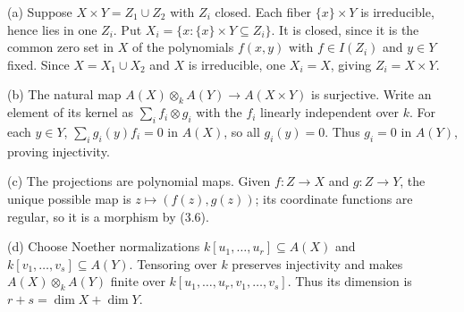 (a) Suppose $X\times Y=Z_1\cup Z_2$ with $Z_i$ closed. Each fiber $\{x\}\times Y$ is irreducible, hence lies in one $Z_i$. Put $X_i=\{x:\{x\}\times Y\subseteq Z_i\}$. It is closed, since it is the common zero set in $X$ of the polynomials $f(x,y)$ with $f\in I(Z_i)$ and $y\in Y$ fixed. Since $X=X_1\cup X_2$ and $X$ is irreducible, one $X_i=X$, giving $Z_i=X\times Y$.

(b) The natural map $A(X)\otimes_k A(Y)\to A(X\times Y)$ is surjective. Write an element of its kernel as $\sum_i f_i\otimes g_i$ with the $f_i$ linearly independent over $k$. For each $y\in Y$, $\sum_i g_i(y)f_i=0$ in $A(X)$, so all $g_i(y)=0$. Thus $g_i=0$ in $A(Y)$, proving injectivity.

(c) The projections are polynomial maps. Given $f:Z\to X$ and $g:Z\to Y$, the unique possible map is $z\mapsto(f(z),g(z))$; its coordinate functions are regular, so it is a morphism by (3.6).

(d) Choose Noether normalizations $k[u_1,\ldots,u_r]\subseteq A(X)$ and $k[v_1,\ldots,v_s]\subseteq A(Y)$. Tensoring over $k$ preserves injectivity and makes $A(X)\otimes_k A(Y)$ finite over $k[u_1,\ldots,u_r,v_1,\ldots,v_s]$. Thus its dimension is $r+s=\dim X+\dim Y$.
